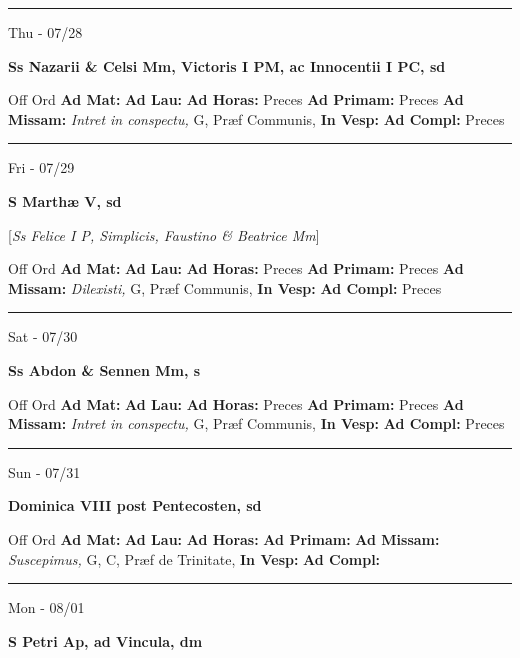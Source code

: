 \documentclass[letterpaper, 10pt]{article}
\begin{document}
\hrule
\begin{center}
Thu - 07/28
\end{center}\textbf{ \large Ss Nazarii \& Celsi Mm, Victoris I PM, ac Innocentii I PC, \textnormal{\normalsize sd}}
\begin{justify}
Off Ord
\textbf{Ad Mat: }
\textbf{Ad Lau: }
\textbf{Ad Horas: }Preces
\textbf{Ad Primam: }Preces
\textbf{Ad Missam:} \textit{Intret in conspectu, } G, Præf Communis, 
\textbf{In Vesp: }
\textbf{Ad Compl: }Preces\end{justify}



\hrule
\begin{center}
Fri - 07/29
\end{center}\textbf{ \large S Marthæ V, \textnormal{\normalsize sd}}

[\textit{Ss Felice I P, Simplicis, Faustino \& Beatrice Mm}]
\begin{justify}
Off Ord
\textbf{Ad Mat: }
\textbf{Ad Lau: }
\textbf{Ad Horas: }Preces
\textbf{Ad Primam: }Preces
\textbf{Ad Missam:} \textit{Dilexisti, } G, Præf Communis, 
\textbf{In Vesp: }
\textbf{Ad Compl: }Preces\end{justify}



\hrule
\begin{center}
Sat - 07/30
\end{center}\textbf{ \large Ss Abdon \& Sennen Mm, \textnormal{\normalsize s}}
\begin{justify}
Off Ord
\textbf{Ad Mat: }
\textbf{Ad Lau: }
\textbf{Ad Horas: }Preces
\textbf{Ad Primam: }Preces
\textbf{Ad Missam:} \textit{Intret in conspectu, } G, Præf Communis, 
\textbf{In Vesp: }
\textbf{Ad Compl: }Preces\end{justify}



\hrule
\begin{center}
Sun - 07/31
\end{center}\textbf{ \large Dominica VIII post Pentecosten, \textnormal{\normalsize sd}}
\begin{justify}
Off Ord
\textbf{Ad Mat: }
\textbf{Ad Lau: }
\textbf{Ad Horas: }
\textbf{Ad Primam: }
\textbf{Ad Missam:} \textit{Suscepimus, } G, C, Præf de Trinitate, 
\textbf{In Vesp: }
\textbf{Ad Compl: }\end{justify}



\hrule
\begin{center}
Mon - 08/01
\end{center}\textbf{ \large S Petri Ap, ad Vincula, \textnormal{\normalsize dm}}
\end{document}
